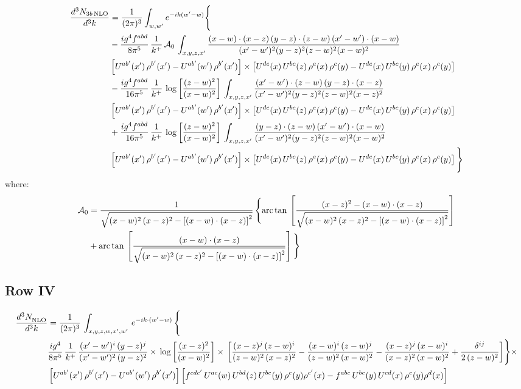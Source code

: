 \documentclass[9pt]{article}
\numberwithin{equation}{section}
\begin{document}
\begin{align}
\frac{d^{3}N_{3b\,\rm NLO}}{d^{3}k} & = \frac{1}{(2\pi)^{3}}\int_{w,w'}e^{-ik(w'-w)}\Bigg\{\notag \\
&-\frac{ig^{4}f^{abd}}{8\pi^{5}}\,\frac{1}{k^{+}}\,\mathcal{A}_{0}\,\int_{x,y,z,x'}
\frac{(x-w)\cdot(x-z)\,(y-z)\cdot(z-w)\,(x'-w')\cdot(x-w)}{(x'-w')^{2}(y-z)^{2}(z-w)^{2}(x-w)^{2}}\notag \\ & \left[U^{ab'}(x')\,\rho^{b'}(x')-U^{ab'}(w')\, \rho^{b'}(x')\right]\times \left[U^{de}(x)\,U^{bc}(z)\, \rho^{e}(x)\,\rho^{c}(y)-U^{de}(x)\,U^{bc}(y)\,\rho^{e}(x)\,\rho^{c}(y)\right] \notag \\
& -\frac{ig^{4}f^{abd}}{16\pi^{5}}\,\frac{1}{k^{+}}\,\log{\left[\frac{(z-w)^{2}}{(x-w)^{2}}\right]}\,\int_{x,y,z,x'}
\frac{(x'-w')\cdot(z-w)\,(y-z)\cdot(x-z)}{(x'-w')^{2}(y-z)^{2}(z-w)^{2}(x-z)^{2}}\notag \\
&\left[U^{ab'}(x')\,\rho^{b'}(x')-U^{ab'}(w')\, \rho^{b'}(x')\right]\times \left[U^{de}(x)\,U^{bc}(z)\, \rho^{e}(x)\,\rho^{c}(y)-U^{de}(x)\,U^{bc}(y)\,\rho^{e}(x)\,\rho^{c}(y)\right] \notag \\
&+ \frac{ig^{4}f^{abd}}{16\pi^{5}}\,\frac{1}{k^{+}}\,\log{\left[\frac{(z-w)^{2}}{(x-w)^{2}}\right]}\,\int_{x,y,z,x'}
\frac{(y-z)\cdot(z-w)\,(x'-w')\cdot(x-w)}{(x'-w')^{2}(y-z)^{2}(z-w)^{2}(x-w)^{2}}\notag \\ 
& \left[U^{ab'}(x')\,\rho^{b'}(x')-U^{ab'}(w')\, \rho^{b'}(x')\right]\times \left[U^{de}(x)\,U^{bc}(z)\, \rho^{e}(x)\,\rho^{c}(y)-U^{de}(x)\,U^{bc}(y)\,\rho^{e}(x)\,\rho^{c}(y)\right]\Bigg\}
\end{align}
where: \begin{align}
\mathcal{A}_{0} & = \frac{1}{\sqrt{(x-w)^{2}\,(x-z)^{2}-\left[(x-w)\cdot (x-z)\right]^{2}}}\, \Bigg\{\mathrm{arc\,tan}\,\left[\frac{(x-z)^{2}-(x-w)\cdot (x-z)}{\sqrt{(x-w)^{2}\,(x-z)^{2}-\left[(x-w)\cdot (x-z)\right]^{2}}}\right]\notag \\ & + \mathrm{arc\,tan}\,\left[\frac{(x-w)\cdot (x-z)}{\sqrt{(x-w)^{2}\,(x-z)^{2}-\left[(x-w)\cdot (x-z)\right]^{2}}}\right] \Bigg\}
\end{align}
\subsection{Row IV}
\begin{align}
    \frac{d^{3}N_{\rm NLO}^{\rm}}{d^{3}k}  & =   \frac{1}{(2\pi)^{3}}\,
    \int_{x,y,z,w,x',w'}\,e^{-ik\cdot (w^\prime-w)}\,\Bigg\{\notag \\
& \frac{ig^{4}}{8\pi^{5}}\,\frac{1}{k^{+}}\,\frac{(x'-w')^{i}\,(y-z)^{j}}{(x'-w')^{2}\,(y-z)^{2}}\times\,\log{\left[\frac{(x-z)^{2}}{(x-w)^{2}}\right]}\times\, \bigg[\frac{(x-z)^{j}\,(z-w)^{i}}{(z-w)^{2}\,(x-z)^{2}} -\frac{(x-w)^{i}\,(z-w)^{j}}{(z-w)^{2}\,(x-w)^{2}}-\frac{(x-z)^{j}\,(x-w)^{i}}{(x-z)^{2}\,(x-w)^{2}}+\frac{\delta^{ij}}{2\,(z-w)^{2}}\bigg]\Bigg\}\times\notag \\ &  \left[U^{ab'}(x')\,\rho^{b'}(x')-U^{ab'}(w')\,\rho^{b'}(x')\right] \left[f^{cdc'}\,U^{ac}(w)\,U^{bd}(z)\,U^{be}(y)\,\rho^{e}(y)\rho^{c'}(x)-f^{abc}\,U^{be}(y)\,U^{cd}(x)\,\rho^{e}(y)\rho^{d}(x)\right]
\end{align}
\end{document}
